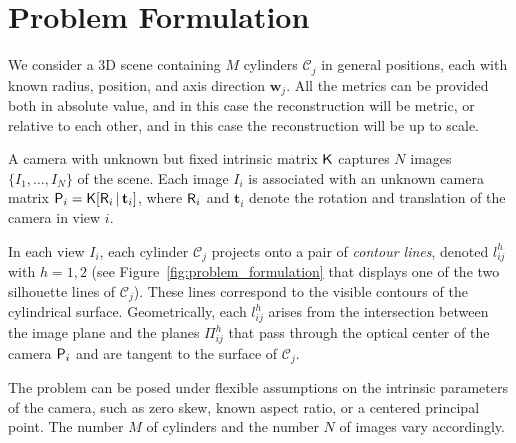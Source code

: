 \section{Problem Formulation}
\label{sec:problem_formulation}

We consider a 3D scene containing $M$ cylinders $\mathcal{C}_j$ in general positions, each with known radius, position, and axis direction $\mathbf{w}_j$. All the metrics can be provided both in absolute value, and in this case the reconstruction will be metric, or relative to each other, and in this case the reconstruction will be up to scale.

A camera with unknown but fixed intrinsic matrix $\mathsf{K}$ captures $N$ images $\{I_1, \ldots, I_N\}$ of the scene. Each image $I_i$ is associated with an unknown camera matrix $\mathsf{P}_i = \mathsf{K}[\mathsf{R}_i \,|\, \mathbf{t}_i]$, where $\mathsf{R}_i$ and $\mathbf{t}_i$ denote the rotation and translation of the camera in view $i$.

In each view $I_i$, each cylinder $\mathcal{C}_j$ projects onto a pair of \emph{contour lines}, denoted $l^h_{ij}$ with $h = 1, 2$ (see Figure~\ref{fig:problem_formulation} that displays one of the two silhouette lines of $\mathcal{C}_j$). These lines correspond to the visible contours of the cylindrical surface. Geometrically, each $l^h_{ij}$ arises from the intersection between the image plane and the planes $\Pi^h_{ij}$ that pass through the optical center of the camera $\mathsf{P}_i$ and are tangent to the surface of $\mathcal{C}_j$.

The problem can be posed under flexible assumptions on the intrinsic parameters of the camera, such as zero skew, known aspect ratio, or a centered principal point. The number $M$ of cylinders and the number $N$ of images vary accordingly.

